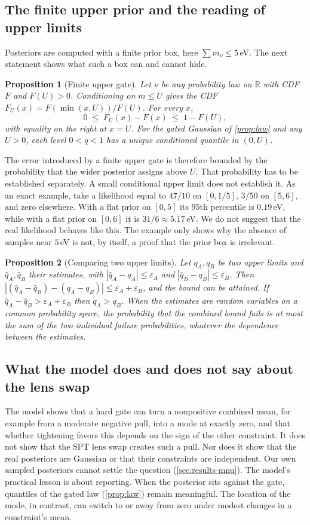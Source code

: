 \documentclass[11pt]{article}
\newtheorem{proposition}{Proposition}
\theoremstyle{remark}
\newcommand{\mnu}{\sum m_\nu}
\numberwithin{equation}{section}
\begin{document}
\subsection{The finite upper prior and the reading of upper limits}
Posteriors are computed with a finite prior box, here $\mnu\le5$\,eV. The next statement shows what such a box can and cannot hide.

\begin{proposition}[Finite upper gate]\label{prop:upper-gate}
Let $\nu$ be any probability law on $\mathbb{R}$ with CDF $F$ and $F(U)>0$. Conditioning on $m\le U$ gives the CDF $F_U(x)=F(\min(x,U))/F(U)$. For every $x$,
\[
  0\;\le\; F_U(x)-F(x)\;\le\; 1-F(U),
\]
with equality on the right at $x=U$. For the gated Gaussian of \cref{prop:law} and any $U>0$, each level $0<q<1$ has a unique conditioned quantile in $(0,U)$.
\end{proposition}

The error introduced by a finite upper gate is therefore bounded by the probability that the wider posterior assigns above $U$. That probability has to be established separately. A small conditional upper limit does not establish it. As an exact example, take a likelihood equal to $47/10$ on $[0,1/5]$, $3/50$ on $[5,6]$, and zero elsewhere. With a flat prior on $[0,5]$ its 95th percentile is $0.19$\,eV, while with a flat prior on $[0,6]$ it is $31/6\approx5.17$\,eV. We do not suggest that the real likelihood behaves like this. The example only shows why the absence of samples near $5$\,eV is not, by itself, a proof that the prior box is irrelevant.

\begin{proposition}[Comparing two upper limits]\label{prop:readout}
Let $q_A,q_B$ be two upper limits and $\hat q_A,\hat q_B$ their estimates, with $|\hat q_A-q_A|\le\varepsilon_A$ and $|\hat q_B-q_B|\le\varepsilon_B$. Then $|(\hat q_A-\hat q_B)-(q_A-q_B)|\le\varepsilon_A+\varepsilon_B$, and the bound can be attained. If $\hat q_A-\hat q_B>\varepsilon_A+\varepsilon_B$ then $q_A>q_B$. When the estimates are random variables on a common probability space, the probability that the combined bound fails is at most the sum of the two individual failure probabilities, whatever the dependence between the estimates.
\end{proposition}

\subsection{What the model does and does not say about the lens swap}
The model shows that a hard gate can turn a nonpositive combined mean, for example from a moderate negative pull, into a mode at exactly zero, and that whether tightening favors this depends on the sign of the other constraint. It does not show that the SPT lens swap creates such a pull. Nor does it show that the real posteriors are Gaussian or that their constraints are independent. Our own sampled posteriors cannot settle the question (\cref{sec:results-mnu}). The model's practical lesson is about reporting. When the posterior sits against the gate, quantiles of the gated law (\cref{prop:law}) remain meaningful. The location of the mode, in contrast, can switch to or away from zero under modest changes in a constraint's mean.
\end{document}
